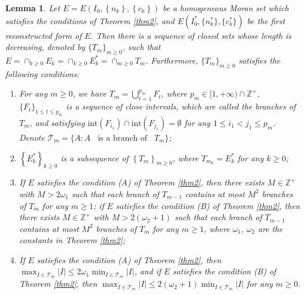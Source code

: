 \documentclass[10pt,a4paper]{amsart}
\newtheorem{lem}{Lemma}
\begin{document}
\begin{lem}\label{l6}
	Let $E=E(I_{0},\left\{n_{k}\right\},\left\{c_{k}\right\})$ be a homogeneous Moran set which satisfies the conditions of Theorem {\rm\ref{thm2}}, and $E(I^*_{0},\{n^*_{k}\},\{c^*_{k}\})$ be the first reconstructed form of $E$. Then there is a sequence of closed sets  whose length is decreasing, denoted by $\{T_{m}\}_{m\ge 0}$, such that $E=\cap_{k\ge0}E_{k}=\cap_{k\ge0}E_{k}^{*}=\cap_{m\ge0}T_{m}$. Furthermore, $\{T_{m}\}_{m\ge 0}$ satisfies the following conditions:
\begin{enumerate}
  \item[\textup{(1)}] For any $m\ge0$, we have $T_{m}=\bigcup_{t=1}^{p_m} F_{t}$, where $p_m \in [1,+\infty)\cap \mathbb{Z}^{+}$,  $\{F_{t}\}_{1\le t\le p_m}$ is a sequence of close intervals, which are called the branches of $T_{m}$, and satisfying $\text{int}(F_{i_1})\cap \text{int}(F_{j_1})=\emptyset$ for any $1\le i_1<j_1\le p_m$. Denote $\mathcal{T}_{m}=\{A: A ~~~~\text{is a branch of}~~~~ T_{m}\}$;
  \item[\textup{(2)}] $\left\{E_{k}^{*}\right\}_{k\ge0}$ is a subsequence of $\left\{T_{m}\right\}_{m\ge 0}$, where $T_{m_{k}}=E_{k}^{*}$ for any $k\ge 0$;

  \item[\textup{(3)}] If $E$ satiefies the condition {\rm(A)} of Theorem {\rm\ref{thm2}}, then there exists $M \in \mathbb{Z}^{+}$ with $M>2\omega_1$ such that each branch of $T_{m-1}$ contains at most $M^{2}$ branches of $T_{m}$ for any $m\ge1$; if $E$ satiefies the condition {\rm(B)} of Theorem {\rm\ref{thm2}}, then there exists $M \in \mathbb{Z}^{+}$ with $M>2(\omega_2+1)$ such that each branch of $T_{m-1}$ contains at most $M^{2}$ branches of $T_{m}$ for any $m\ge1$, where $\omega_1$, $\omega_2$ are the constants in Theorem {\rm\ref{thm2}};
		\item[\textup{(4)}]If $E$ satiefies the condition {\rm(A)} of Theorem {\rm\ref{thm2}}, then $\max_{I\in \mathcal{T}_m}\left | I \right |\le 2 \omega_1\min_{I\in \mathcal{T}_m}\left | I \right |$, and if $E$ satiefies the condition {\rm(B)} of Theorem {\rm\ref{thm2}}, then
$\max_{I\in \mathcal{T}_m}\left | I \right |\le 2 (\omega_2+1)\min_{I\in \mathcal{T}_m}\left | I \right |$ for any $m\ge0$.
\end{enumerate}
\end{lem}
\end{document}

